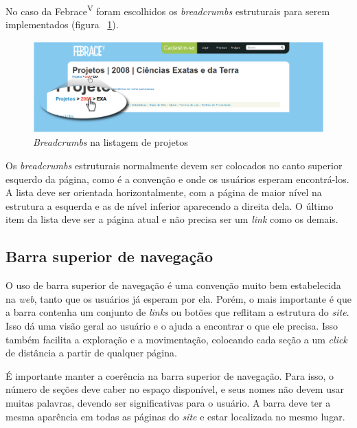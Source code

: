 No caso da Febrace\textsuperscript{V} foram escolhidos os \textit{breadcrumbs} estruturais para serem implementados (figura ~\ref{breadcrumbs}).

    \begin{figure}[h]
        \begin{center}
    \includegraphics[width=1.0\linewidth]{arquivos/breadcrumbs.png}
        \end{center}
        \caption{\textit{Breadcrumbs} na listagem de projetos}
        \label{breadcrumbs}
    \end{figure}

Os \textit{breadcrumbs} estruturais normalmente devem ser colocados no canto superior esquerdo da página, como é a convenção e onde os usuários esperam encontrá-los. A lista deve ser orientada horizontalmente, com a página de maior nível na estrutura a esquerda e as de nível inferior aparecendo a direita dela. O último item da lista deve ser a página atual e não precisa ser um \textit{link} como os demais.

\subsection{Barra superior de navegação}

O uso de barra superior de navegação é uma convenção muito bem estabelecida na \textit{web}, tanto que os usuários já esperam por ela. Porém, o mais importante é que a barra contenha um conjunto de \textit{links} ou botões que reflitam a estrutura do \textit{site}. Isso dá uma visão geral ao usuário e o ajuda a encontrar o que ele precisa. Isso também facilita a exploração e a movimentação, colocando cada seção a um \textit{click} de distância a partir de qualquer página.

É importante manter a coerência na barra superior de navegação. Para isso, o número de seções deve caber no espaço disponível, e seus nomes não devem usar muitas palavras, devendo ser significativas para o usuário. A barra deve ter a mesma aparência em todas as páginas do \textit{site} e estar localizada no mesmo lugar.

